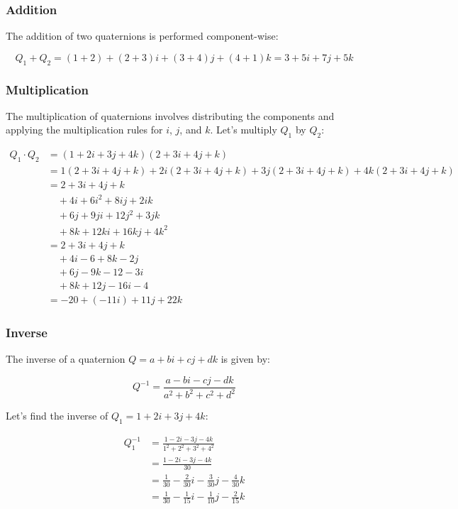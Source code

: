 \documentclass[
]{article}
\begin{document}
\subsubsection{Addition}\label{addition}

The addition of two quaternions is performed component-wise:

\[ Q_1 + Q_2 = (1 + 2) + (2 + 3)i + (3 + 4)j + (4 + 1)k = 3 + 5i + 7j + 5k \]

\subsubsection{Multiplication}\label{multiplication-1}

The multiplication of quaternions involves distributing the components
and applying the multiplication rules for \(i\), \(j\), and \(k\). Let's
multiply \(Q_1\) by \(Q_2\):

\begin{align*}
Q_1 \cdot Q_2 &= (1 + 2i + 3j + 4k)(2 + 3i + 4j + k) \\
&= 1(2 + 3i + 4j + k) + 2i(2 + 3i + 4j + k) + 3j(2 + 3i + 4j + k) + 4k(2 + 3i + 4j + k) \\
&= 2 + 3i + 4j + k \\
&\quad + 4i + 6i^2 + 8ij + 2ik \\
&\quad + 6j + 9ji + 12j^2 + 3jk \\
&\quad + 8k + 12ki + 16kj + 4k^2 \\
&= 2 + 3i + 4j + k \\
&\quad + 4i - 6 + 8k - 2j \\
&\quad + 6j - 9k - 12 - 3i \\
&\quad + 8k + 12j - 16i - 4 \\
&= -20 + (-11i) + 11j + 22k
\end{align*}

\subsubsection{Inverse}\label{inverse}

The inverse of a quaternion \(Q = a + bi + cj + dk\) is given by:

\[ Q^{-1} = \frac{a - bi - cj - dk}{a^2 + b^2 + c^2 + d^2} \]

Let's find the inverse of \(Q_1 = 1 + 2i + 3j + 4k\):

\begin{align*}
Q_1^{-1} &= \frac{1 - 2i - 3j - 4k}{1^2 + 2^2 + 3^2 + 4^2} \\
&= \frac{1 - 2i - 3j - 4k}{30} \\
&= \frac{1}{30} - \frac{2}{30}i - \frac{3}{30}j - \frac{4}{30}k \\
&= \frac{1}{30} - \frac{1}{15}i - \frac{1}{10}j - \frac{2}{15}k
\end{align*}
\end{document}
